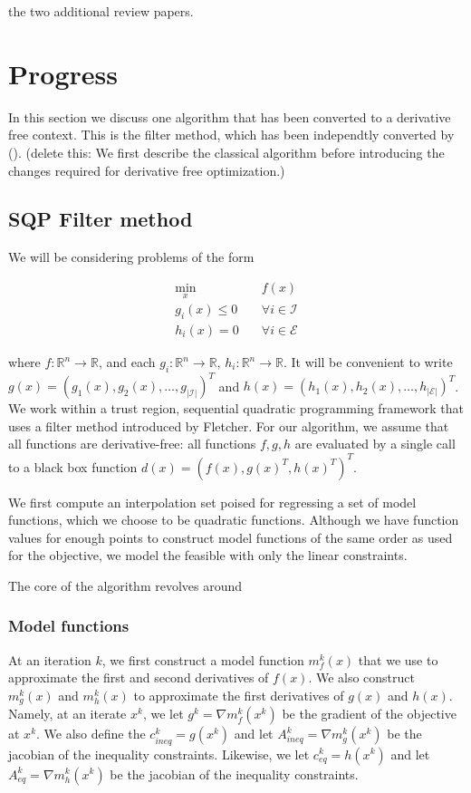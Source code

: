 \documentclass{article}
\begin{document}
the two additional review papers.





\section{Progress}

In this section we discuss one algorithm that has been converted to a derivative free context.
This is the filter method, which has been independtly converted by ().
(delete this: We first describe the classical algorithm before introducing the changes required for derivative free optimization.)


\subsection{SQP Filter method}

We will be considering problems of the form


\begin{center}
\begin{align*}
\min_x & \quad f(x) \\
  g_i(x) \le 0   & \quad \forall i \in \mathcal {I} \\
  h_i(x)  = 0    & \quad \forall i \in \mathcal {E} 
\end{align*}
\end{center}

where $f : \mathbb R^n \to \mathbb R$, and each $g_i : \mathbb{R}^{n} \to \mathbb{R}$, $h_i : \mathbb{R}^{n} \to \mathbb{R}$.
It will be convenient to write
$g(x) = (g_1(x), g_2(x), \ldots, g_{|\mathcal{I}|})^T$ and 
$h(x) = (h_1(x), h_2(x), \ldots, h_{|\mathcal{E}|})^T$.
We work within a trust region, sequential quadratic programming framework that uses a filter method introduced by Fletcher.
For our algorithm, we assume that all functions are derivative-free: all functions $f,g,h$ are evaluated by a single call to a black box function $d(x) = (f(x), g(x)^T, h(x)^T)^T$.

We first compute an interpolation set poised for regressing a set of model functions, which we choose to be quadratic functions.
Although we have function values for enough points to construct model functions of the same order as used for the objective, we model the feasible with only the linear constraints.

The core of the algorithm revolves around

\subsubsection{Model functions}
At an iteration $k$, we first construct a model function $m_f^k(x)$ that we use to approximate the first and second derivatives of $f(x)$.
We also construct $m_g^k(x)$ and $m_h^k(x)$ to approximate the first derivatives of $g(x)$ and $h(x)$.
Namely, at an iterate $x^k$, we let $g^k = \nabla m_f^k(x^k)$ be the gradient of the objective at $x^k$.
We also define the $c_{ineq}^k = g(x^k)$ and let $A_{ineq}^k = \nabla m_g^k(x^k)$ be the jacobian of the inequality constraints.
Likewise, we let $c_{eq}^k = h(x^k)$ and let $A_{eq}^k = \nabla m_h^k(x^k)$ be the jacobian of the inequality constraints.
\end{document}
